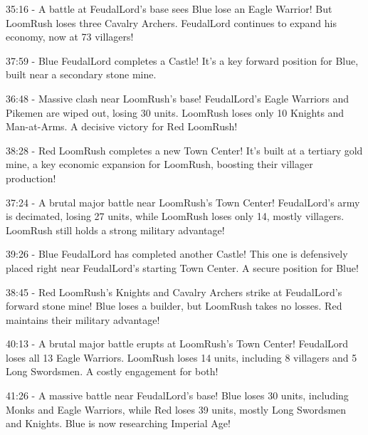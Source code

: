 35:16 - A battle at FeudalLord's base sees Blue lose an Eagle Warrior! But LoomRush loses three Cavalry Archers. FeudalLord continues to expand his economy, now at 73 villagers! \par \vspace{1em}

37:59 - Blue FeudalLord completes a Castle! It's a key forward position for Blue, built near a secondary stone mine. \par \vspace{1em}

36:48 - Massive clash near LoomRush's base! FeudalLord's Eagle Warriors and Pikemen are wiped out, losing 30 units. LoomRush loses only 10 Knights and Man-at-Arms. A decisive victory for Red LoomRush! \par \vspace{1em}

38:28 - Red LoomRush completes a new Town Center! It's built at a tertiary gold mine, a key economic expansion for LoomRush, boosting their villager production! \par \vspace{1em}

37:24 - A brutal major battle near LoomRush's Town Center! FeudalLord's army is decimated, losing 27 units, while LoomRush loses only 14, mostly villagers. LoomRush still holds a strong military advantage! \par \vspace{1em}

39:26 - Blue FeudalLord has completed another Castle! This one is defensively placed right near FeudalLord's starting Town Center. A secure position for Blue! \par \vspace{1em}

38:45 - Red LoomRush's Knights and Cavalry Archers strike at FeudalLord's forward stone mine! Blue loses a builder, but LoomRush takes no losses. Red maintains their military advantage! \par \vspace{1em}

40:13 - A brutal major battle erupts at LoomRush's Town Center! FeudalLord loses all 13 Eagle Warriors. LoomRush loses 14 units, including 8 villagers and 5 Long Swordsmen. A costly engagement for both! \par \vspace{1em}

41:26 - A massive battle near FeudalLord's base! Blue loses 30 units, including Monks and Eagle Warriors, while Red loses 39 units, mostly Long Swordsmen and Knights. Blue is now researching Imperial Age! \par \vspace{1em}

